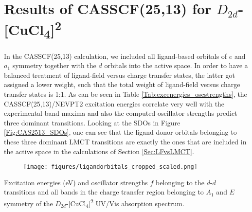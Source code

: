

\section{Results of CASSCF(25,13) for $D_{2d}$-[CuCl\textsubscript{4}]\textsuperscript{2\textminus}}
\label{Sec:appendix_CAS2513}
In the CASSCF(25,13) calculation, we included all ligand-based orbitals of $e$ and $a_1$ symmetry together with the $d$ orbitals into the active space. In order to have a balanced treatment of ligand-field versus charge transfer states, the latter got assigned a lower weight, such that the total weight of ligand-field versus charge transfer states is 1:1. As can be seen in Table \ref{Tab:excenergies_oscstrengths}, the CASSCF(25,13)/NEVPT2 excitation energies correlate very well with the experimental band maxima and also the computed oscillator strengths predict three dominant transitions. Looking at the SDOs in Figure \ref{Fig:CAS2513_SDOs}, one can see that the ligand donor orbitals belonging to these three dominant LMCT transitions are exactly the ones that are included in the active space in the calculations of Section \ref{Sec:LFvsLMCT}.
\begin{figure}
{\texttt{[image: figures/ligandorbitals\_cropped\_scaled.png]}}
\end{figure}

\begin{table}
\small
\centering
\ttabbox
{\caption[Excitation energies and oscillator strengths of $D_{2d}$-{[CuCl\textsubscript{4}]}\textsuperscript{2\textminus}.]{Excitation energies (eV) and oscillator strengths $f$ belonging to the $d$-$d$ transitions and all bands in the charge transfer region belonging to $A_1$ and $E$ symmetry of the $D_{2d}$-[CuCl\textsubscript{4}]\textsuperscript{2\textminus} UV/Vis absorption spectrum.}
\label{Tab:excenergies_oscstrengths}}
{
}
\end{table}

